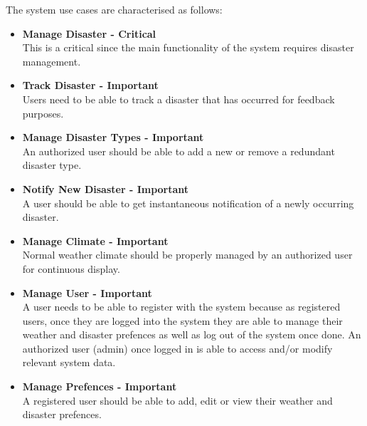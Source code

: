 The system use cases are characterised as follows:
 \begin{itemize}

 	\item \textbf{Manage Disaster - Critical}\\ This is a critical since the main functionality of the system requires disaster management.
 	\item \textbf{Track Disaster - Important}\\ Users need to be able to track a disaster that has occurred for feedback purposes. 
 	\item \textbf{Manage Disaster Types - Important}\\ An authorized user should be able to add a new or remove a redundant disaster type.
 	\item \textbf{Notify New Disaster - Important}\\ A user should be able to get instantaneous notification of a newly occurring disaster.
 	\item \textbf{Manage Climate - Important}\\ Normal weather climate should be properly managed by an authorized user for continuous display.
 	\item \textbf{Manage User - Important} \\ A user needs to be able to register with the system because as registered users, once they are logged into the system they are able to manage their weather and disaster prefences as well as log out of the system once done. An authorized user (admin) once logged in is able to access and/or modify relevant system data.
	\item \textbf{Manage Prefences - Important} \\ A registered user should be able to add, edit or view their weather and disaster prefences.  
 \end{itemize}